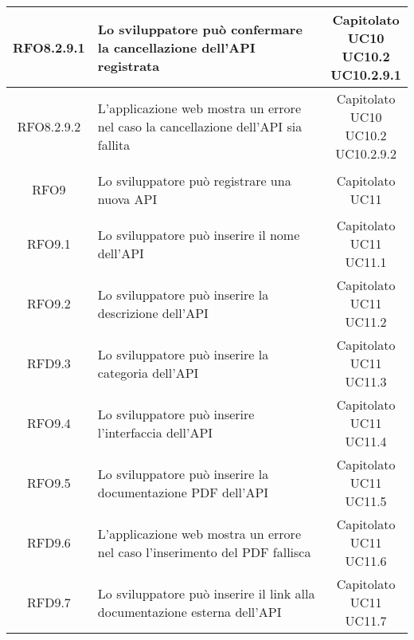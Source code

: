\begin{longtable}{|c|p{8cm}|c|}
\hypertarget{RFO8.2.9.1}{RFO8.2.9.1} & Lo sviluppatore può confermare la cancellazione dell'API registrata & \makecell*{Capitolato\\UC10\\UC10.2\\UC10.2.9.1} \\
\hline
\hypertarget{RFO8.2.9.2}{RFO8.2.9.2} & L'applicazione web mostra un errore nel caso la cancellazione dell'API sia fallita & \makecell*{Capitolato\\UC10\\UC10.2\\UC10.2.9.2} \\
\hline

\hypertarget{RFO9}{RFO9} & Lo sviluppatore può registrare una nuova API & \makecell*{Capitolato\\UC11} \\
\hline

\hypertarget{RFO9.1}{RFO9.1} & Lo sviluppatore può inserire il nome dell'API & \makecell*{Capitolato\\UC11\\UC11.1} \\
\hline
\hypertarget{RFO9,2}{RFO9.2} & Lo sviluppatore può inserire la descrizione dell'API & \makecell*{Capitolato\\UC11\\UC11.2} \\
\hline
\hypertarget{RFD9.3}{RFD9.3} & Lo sviluppatore può inserire la categoria dell'API & \makecell*{Capitolato\\UC11\\UC11.3} \\
\hline
\hypertarget{RFO9.4}{RFO9.4} & Lo sviluppatore può inserire l'interfaccia dell'API & \makecell*{Capitolato\\UC11\\UC11.4} \\
\hline
\hypertarget{RFO9.5}{RFO9.5} & Lo sviluppatore può inserire la documentazione PDF dell'API & \makecell*{Capitolato\\UC11\\UC11.5} \\
\hline
\hypertarget{RFD9.6}{RFD9.6} & L'applicazione web mostra un errore nel caso l'inserimento del PDF fallisca & \makecell*{Capitolato\\UC11\\UC11.6} \\
\hline
\hypertarget{RFD9.7}{RFD9.7} & Lo sviluppatore può inserire il link alla documentazione esterna dell'API & \makecell*{Capitolato\\UC11\\UC11.7} \\
\hline


\end{longtable}
